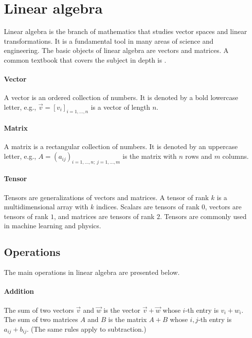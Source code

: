\section{Linear algebra}

Linear algebra is the branch of mathematics that studies vector spaces and linear
transformations.  It is a fundamental tool in many areas of science and engineering.
The basic objects of linear algebra are vectors and matrices.  A common textbook that
covers the subject in depth is \textcite{Strang2023}.

\paragraph{Vector}  A vector is an ordered collection of numbers.  It is denoted by a bold
lowercase letter, e.g., $\vec{v} = [v_i]_{i=1,\dots, n}$ is a vector of length $n$.

\paragraph{Matrix}  A matrix is a rectangular collection of numbers.  It is denoted by an
uppercase letter, e.g., $A = (a_{ij})_{i = 1, \dots, n;~j = 1, \dots, m}$ is the matrix
with $n$ rows and $m$ columns.

\paragraph{Tensor}  Tensors are generalizations of vectors and matrices.  A tensor of rank
$k$ is a multidimensional array with $k$ indices.  Scalars are tensors of rank $0$,
vectors are tensors of rank $1$, and matrices are tensors of rank $2$.  Tensors are
commonly used in machine learning and physics.

\subsection{Operations}

The main operations in linear algebra are presented below.

\paragraph{Addition}  The sum of two vectors $\vec{v}$ and $\vec{w}$ is the vector
$\vec{v} + \vec{w}$ whose $i$-th entry is $v_i + w_i$.  The sum of two matrices $A$ and
$B$ is the matrix $A + B$ whose $i, j$-th entry is $a_{ij} + b_{ij}$.  (The same rules apply
to subtraction.)

